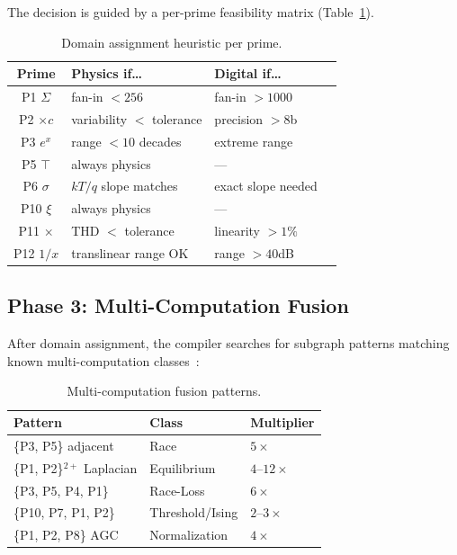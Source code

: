 \documentclass[11pt]{article}
\begin{document}
The decision is guided by a per-prime feasibility matrix (Table~\ref{tab:assignment}).

\begin{table}[h]
\centering
\caption{Domain assignment heuristic per prime.}
\label{tab:assignment}
\small
\begin{tabular}{clll}
\toprule
Prime & Physics if\ldots & Digital if\ldots \\
\midrule
P1 $\Sigma$ & fan-in $< 256$ & fan-in $> 1000$ \\
P2 $\times c$ & variability $<$ tolerance & precision $> 8$b \\
P3 $e^x$ & range $< 10$ decades & extreme range \\
P5 $\top$ & always physics & --- \\
P6 $\sigma$ & $kT/q$ slope matches & exact slope needed \\
P10 $\xi$ & always physics & --- \\
P11 $\times$ & THD $<$ tolerance & linearity $> 1\%$ \\
P12 $1/x$ & translinear range OK & range $> 40$dB \\
\bottomrule
\end{tabular}
\end{table}

\subsection{Phase 3: Multi-Computation Fusion}

After domain assignment, the compiler searches for subgraph patterns matching known multi-computation classes~\cite{bieg2026}:

\begin{table}[h]
\centering
\caption{Multi-computation fusion patterns.}
\label{tab:fusion}
\small
\begin{tabular}{lll}
\toprule
Pattern & Class & Multiplier \\
\midrule
\{P3, P5\} adjacent & Race & $5\times$ \\
\{P1, P2\}$^{2+}$ Laplacian & Equilibrium & $4$--$12\times$ \\
\{P3, P5, P4, P1\} & Race-Loss & $6\times$ \\
\{P10, P7, P1, P2\} & Threshold/Ising & $2$--$3\times$ \\
\{P1, P2, P8\} AGC & Normalization & $4\times$ \\
\bottomrule
\end{tabular}
\end{table}
\end{document}

